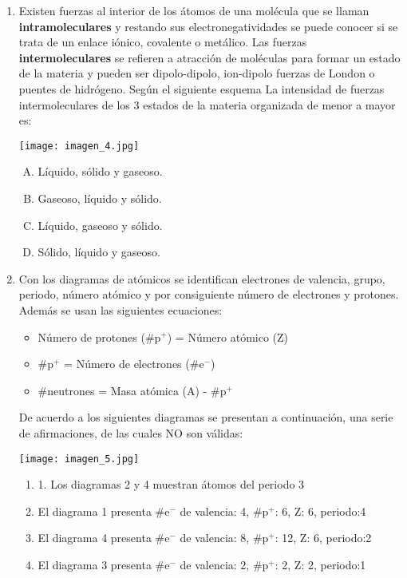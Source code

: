 \begin{enumerate}
\item Existen fuerzas al interior de los átomos de una molécula que se llaman \textbf{intramoleculares} y restando sus electronegatividades se puede conocer si se trata de un enlace iónico, covalente o metálico. Las fuerzas \textbf{intermoleculares} se refieren a atracción de moléculas para formar un estado de la materia y pueden ser dipolo-dipolo, ion-dipolo fuerzas de London o puentes de hidrógeno. Según el siguiente esquema La intensidad de fuerzas intermoleculares de los 3 estados de la materia organizada de menor a mayor es:\label{mon-6}

\texttt{[image: imagen\_4.jpg]}
\justifying

\begin{enumerate}[(A)]
\item Líquido, sólido y gaseoso.
\item Gaseoso, líquido y sólido.
\item Líquido, gaseoso y sólido.
\item Sólido, líquido y gaseoso.
\end{enumerate}


\item Con los diagramas de atómicos se identifican electrones de valencia, grupo, periodo, número atómico y por consiguiente número de electrones y protones. Además se usan las siguientes ecuaciones: \label{mon-7}

\begin{itemize}
\item Número de protones (\#p$^+$) = Número atómico (Z)
\item \#p$^+$ = Número de electrones (\#e$^-$)
\item \#neutrones = Masa atómica (A) - \#p$^+$
\end{itemize}

De acuerdo a los siguientes diagramas se presentan a continuación, una serie de afirmaciones, de las cuales NO son válidas:

\texttt{[image: imagen\_5.jpg]}
\justifying

\begin{enumerate}[I]
\item 1. Los diagramas 2 y 4 muestran átomos del periodo 3 
\item El diagrama 1 presenta \#e$^-$ de valencia: 4,  \#p$^+$: 6,  Z: 6, periodo:4
\item El diagrama 4 presenta \#e$^-$ de valencia: 8,  \#p$^+$: 12,  Z: 6, periodo:2
\item El diagrama 3 presenta \#e$^-$ de valencia: 2,  \#p$^+$: 2,  Z: 2, periodo:1
\end{enumerate}


\end{enumerate}
